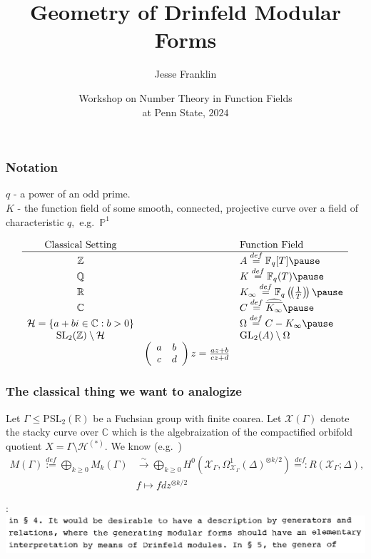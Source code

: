 \documentclass[handout]{beamer}
\title{Geometry of Drinfeld Modular Forms}
\author{Jesse Franklin}
\institute{University of Vermont}
\date{Workshop on Number Theory in Function Fields\\at Penn State, $2024$}
\numberwithin{equation}{section}
\numberwithin{case}{theorem}
\newcommand{\cH}{\mathcal{H}}		%
\newcommand{\sX}{\mathscr{X}}		%
\newcommand{\bbC}{\mathbb{C}}		%
\newcommand{\bbF}{\mathbb{F}}		%
\newcommand{\bbP}{\mathbb{P}}		%
\newcommand{\bbQ}{\mathbb{Q}}		%
\newcommand{\bbR}{\mathbb{R}}		%
\newcommand{\bbZ}{\mathbb{Z}}		%
\newcommand{\GL}{\mathrm{GL}} 	%
\newcommand{\PSL}{\mathrm{PSL}} 	%
\newcommand{\SL}{\mathrm{SL}} 	%
\newcommand{\<}{\left\langle}
\renewcommand{\>}{\right\rangle}
\begin{document}
	
	\frame{\titlepage}
	
	\begin{frame}
		\frametitle{Notation}
		$q$ - a power of an odd prime.\\ 
		$K$ - the function field of some smooth, connected, projective curve over a field of characteristic $q,$ \pause  e.g.\ $\bbP^1$
		
		\[\begin{array}{ccl}
			\text{Classical Setting} && \text{Function Field}\\
			\hline
			\bbZ && A\overset{def}{=}\bbF_q[T]\pause\\
			\bbQ && K \overset{def}{=} \bbF_q(T)\pause\\
			\bbR && K_{\infty}\overset{def}{=}\bbF_q\left(\!\left(\frac{1}{T}\right)\!\right) \pause\\
			\bbC && C \overset{def}{=} \widehat{\overline{K_{\infty}}}\pause\\
			\cH = \{a+bi\in \bbC:b>0\} && \Omega \overset{def}{=} C-K_{\infty}\pause\\
			\SL_2(\bbZ)\setminus\cH && \GL_2(A)\setminus \Omega\\
			&\left(\begin{array}{cc}a&b\\c&d\end{array}\right)z=\frac{az+b}{cz+d}&
		\end{array}\]
	\end{frame}
	
	\begin{frame}
		\frametitle{The classical thing we want to analogize}
		Let $\Gamma\leq \PSL_2(\bbR)$ be a Fuchsian group with finite coarea. Let $\sX(\Gamma)$ denote the stacky curve over $\bbC$ which is the algebraization of the compactified orbifold quotient $X=\Gamma\setminus \cH^{(*)}.$ \pause We know (e.g.\ \cite[Chapter $6$]{VZB})
		\begin{align*}
			M(\Gamma)\overset{def}{:=}\bigoplus_{k\geq 0}M_k(\Gamma)&\overset{\sim}{\longrightarrow} \bigoplus_{k\geq 0} H^0(\sX_{\Gamma},\Omega^1_{\sX_{\Gamma}}(\Delta)^{\otimes k/2})\overset{def}{=:}R(\sX_{\Gamma};\Delta),\\
			&f\mapsto fdz^{\otimes k/2}
		\end{align*}
		
		\pause 

		\cite[page $13$]{Gekeler-Curves}:
		\includegraphics[scale=0.45]{gek-pg13.png}
	\end{frame}	
	
\end{document}
